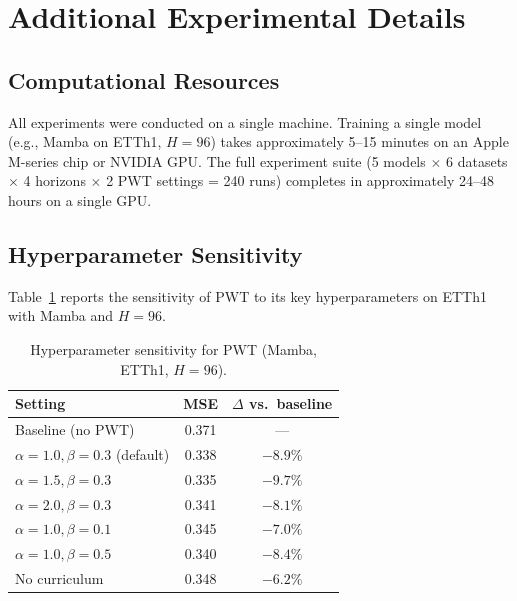 \documentclass[10pt]{article}
\newcommand{\pwt}{\textsc{PWT}}
\begin{document}



\appendix

\section{Additional Experimental Details}
\label{app:details}

\subsection{Computational Resources}

All experiments were conducted on a single machine. Training a single model (e.g., Mamba on ETTh1, $H=96$) takes approximately 5--15 minutes on an Apple M-series chip or NVIDIA GPU. The full experiment suite (5 models $\times$ 6 datasets $\times$ 4 horizons $\times$ 2 PWT settings = 240 runs) completes in approximately 24--48 hours on a single GPU.

\subsection{Hyperparameter Sensitivity}

Table~\ref{tab:hyperparam} reports the sensitivity of \pwt{} to its key hyperparameters on ETTh1 with Mamba and $H=96$.

\begin{table}[h]
\caption{Hyperparameter sensitivity for \pwt{} (Mamba, ETTh1, $H=96$).}
\label{tab:hyperparam}
\begin{center}
\begin{tabular}{lcc}
\toprule
\textbf{Setting} & \textbf{MSE} & \textbf{$\Delta$ vs.\ baseline} \\
\midrule
Baseline (no \pwt{}) & 0.371 & --- \\
$\alpha=1.0, \beta=0.3$ (default) & 0.338 & $-8.9\%$ \\
$\alpha=1.5, \beta=0.3$ & 0.335 & $-9.7\%$ \\
$\alpha=2.0, \beta=0.3$ & 0.341 & $-8.1\%$ \\
$\alpha=1.0, \beta=0.1$ & 0.345 & $-7.0\%$ \\
$\alpha=1.0, \beta=0.5$ & 0.340 & $-8.4\%$ \\
No curriculum & 0.348 & $-6.2\%$ \\
\bottomrule
\end{tabular}
\end{center}
\end{table}
\end{document}
